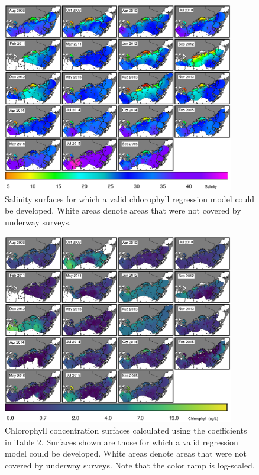 \clearpage

\begin{figure}
  \centering
  \includegraphics[width=0.9\textwidth]{../../figures/multipanel_salinity.png}
  \caption{Salinity surfaces for which a valid chlorophyll regression model could be developed. White areas denote areas that were not covered by underway surveys.}
  \label{fig:5}
\end{figure}

\clearpage

\begin{figure}
  \centering
  \includegraphics[width=0.9\textwidth]{../../figures/multipanel.png}
  \caption{Chlorophyll concentration surfaces calculated using the coefficients in Table 2. Surfaces shown are those for which a valid regression model could be developed. White areas denote areas that were not covered by underway surveys. Note that the color ramp is log-scaled.}
  \label{fig:4}
\end{figure}

